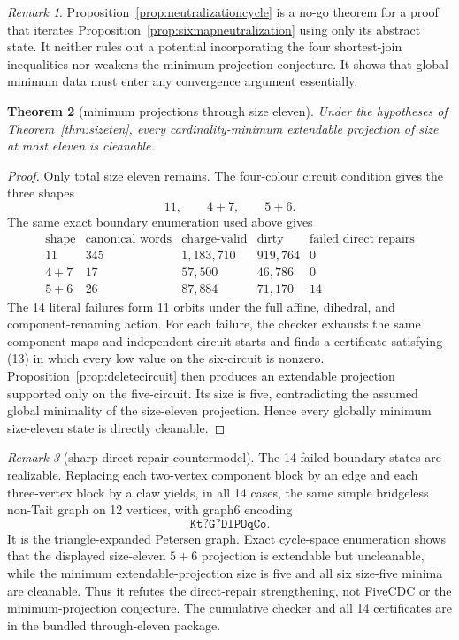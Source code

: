 \documentclass[11pt]{article}
\newtheorem{theorem}{Theorem}[section]
\theoremstyle{definition}
\theoremstyle{remark}
\newtheorem{remark}[theorem]{Remark}
\begin{document}
\begin{remark}
Proposition~\ref{prop:neutralizationcycle} is a no-go theorem for a proof
that iterates Proposition~\ref{prop:sixmapneutralization} using only its
abstract state.  It neither rules out a potential incorporating the four
shortest-join inequalities nor weakens the minimum-projection conjecture.
It shows that global-minimum data must enter any convergence argument
essentially.
\end{remark}

\begin{theorem}[minimum projections through size eleven]
\label{thm:sizeeleven}
Under the hypotheses of Theorem~\ref{thm:sizeten}, every
cardinality-minimum extendable projection of size at most eleven is
cleanable.
\end{theorem}

\begin{proof}
Only total size eleven remains.  The four-colour circuit condition gives
the three shapes
\[
                         11,\qquad4+7,\qquad5+6.          \tag{16}
\]
The same exact boundary enumeration used above gives
\[
\begin{array}{c|r|r|r|r}
\text{shape}&\text{canonical words}&\text{charge-valid}&
\text{dirty}&\text{failed direct repairs}\\
\hline
11&345&1{,}183{,}710&919{,}764&0\\
4+7&17&57{,}500&46{,}786&0\\
5+6&26&87{,}884&71{,}170&14
\end{array}
\]
The 14 literal failures form 11 orbits under the full affine, dihedral,
and component-renaming action.  For each failure, the checker exhausts
the same component maps and independent circuit starts and finds a
certificate satisfying (13) in which every low value on the six-circuit
is nonzero.  Proposition~\ref{prop:deletecircuit} then produces an
extendable projection supported only on the five-circuit.  Its size is
five, contradicting the assumed global minimality of the size-eleven
projection.  Hence every globally minimum size-eleven state is directly
cleanable.
\end{proof}

\begin{remark}[sharp direct-repair countermodel]
The 14 failed boundary states are realizable.  Replacing each two-vertex
component block by an edge and each three-vertex block by a claw yields,
in all 14 cases, the same simple bridgeless non-Tait graph on 12 vertices,
with graph6 encoding
\[
                         \texttt{Kt?G?DIPOqCo}.
\]
It is the triangle-expanded Petersen graph.  Exact cycle-space enumeration
shows that the displayed size-eleven \(5+6\) projection is extendable but
uncleanable, while the minimum extendable-projection size is five and all
six size-five minima are cleanable.  Thus it refutes the direct-repair
strengthening, not FiveCDC or the minimum-projection conjecture.  The
cumulative checker and all 14 certificates are in the bundled
through-eleven package.
\end{remark}
\end{document}
